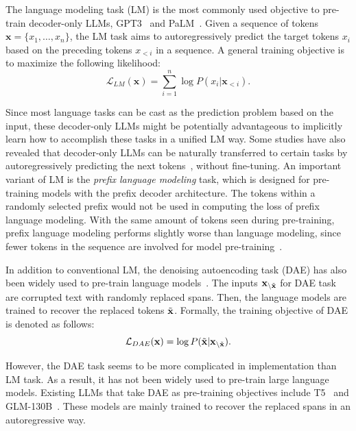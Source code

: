 {{ 
The language modeling task (LM) is the most commonly used objective to pre-train decoder-only LLMs, \eg GPT3~\cite{Brown-NeurIPS-2020-Language} and PaLM~\cite{Chowdhery-arxiv-2022-PaLM}. Given a sequence of tokens $\mathbf{x}=\{x_1,\dots,x_n\}$, the LM task aims to autoregressively predict the target tokens  %
{$x_i$ based on the preceding tokens $x_{<i}$ in a sequence}. A general  training objective is to maximize the following likelihood: %
\begin{equation}
    \mathcal{L}_{LM}(\mathbf{x})=\sum_{i=1}^n \log P(x_i|\mathbf{x}_{<i}).\label{eq:lm}
\end{equation}

Since most language tasks can be cast as the prediction problem based on the input,  %
{these decoder-only} LLMs might be potentially advantageous to implicitly learn how to accomplish these tasks in a unified LM way. 
Some studies have also revealed that  %
{decoder-only} LLMs can be naturally transferred to certain tasks by autoregressively predicting the next tokens~\cite{radford-blog-2019-language,Brown-NeurIPS-2020-Language}, without fine-tuning.  
An important variant of LM is the \emph{prefix language modeling} task,  %
{which is designed for pre-training models with the prefix decoder architecture.
The tokens within a randomly selected prefix would not be used in computing the loss of prefix language modeling.} 
{
With the same amount of tokens seen during pre-training, prefix language modeling  performs slightly worse than language modeling, since fewer tokens in the sequence are involved for model pre-training~\cite{Wang-ICML-2022-What}.} %


{
In addition to conventional LM, the denoising autoencoding task (DAE) has also been widely used to pre-train language models~\cite{Lewis-ACL-2020-BART,Raffel-JMLR-2020-Exploring}.
The inputs $\mathbf{x}_{\backslash \Tilde{\mathbf{x}}}$ for DAE task are corrupted text with randomly replaced spans. Then, the language models are trained to recover the replaced tokens $\Tilde{\mathbf{x}}$. Formally, the training objective of DAE is  denoted as follows:}
\begin{equation}
    \mathcal{L}_{DAE}(\mathbf{x})= \log P(\Tilde{\mathbf{x}}|\mathbf{x}_{\backslash \Tilde{\mathbf{x}}}).\label{eq:dae}
\end{equation}

However, the DAE task seems to be more complicated in implementation than LM task. As a result, it has not been widely used to pre-train  large language models. 
Existing LLMs that take DAE as pre-training objectives include T5~\cite{Raffel-JMLR-2020-Exploring} and GLM-130B~\cite{Zeng-arxiv-2022-GLM}. These models are mainly trained to recover the replaced spans in an autoregressive way.

}}
